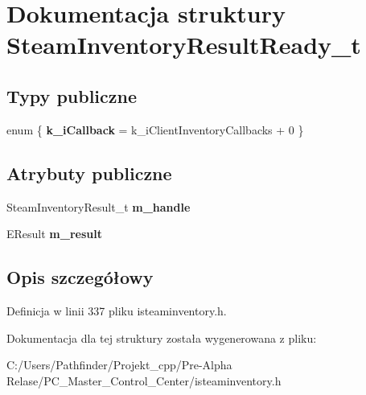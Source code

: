 \hypertarget{struct_steam_inventory_result_ready__t}{}\section{Dokumentacja struktury Steam\+Inventory\+Result\+Ready\+\_\+t}
\label{struct_steam_inventory_result_ready__t}
\subsection*{Typy publiczne}
\begin{DoxyCompactItemize}
\item 
\mbox{\label{struct_steam_inventory_result_ready__t_a33a4c325f30e76d8f1fd0a8445ba7ed2}} 
enum \{ {\bfseries k\+\_\+i\+Callback} = k\+\_\+i\+Client\+Inventory\+Callbacks + 0
 \}
\end{DoxyCompactItemize}
\subsection*{Atrybuty publiczne}
\begin{DoxyCompactItemize}
\item 
\mbox{\label{struct_steam_inventory_result_ready__t_a658ee00d502cdcd5ff4560bddb1e47dd}} 
Steam\+Inventory\+Result\+\_\+t {\bfseries m\+\_\+handle}
\item 
\mbox{\label{struct_steam_inventory_result_ready__t_af75c8e78d3755be36cccdc79ad9afa57}} 
E\+Result {\bfseries m\+\_\+result}
\end{DoxyCompactItemize}


\subsection{Opis szczegółowy}


Definicja w linii 337 pliku isteaminventory.\+h.



Dokumentacja dla tej struktury została wygenerowana z pliku\+:\begin{DoxyCompactItemize}
\item 
C\+:/\+Users/\+Pathfinder/\+Projekt\+\_\+cpp/\+Pre-\/\+Alpha Relase/\+P\+C\+\_\+\+Master\+\_\+\+Control\+\_\+\+Center/isteaminventory.\+h\end{DoxyCompactItemize}
